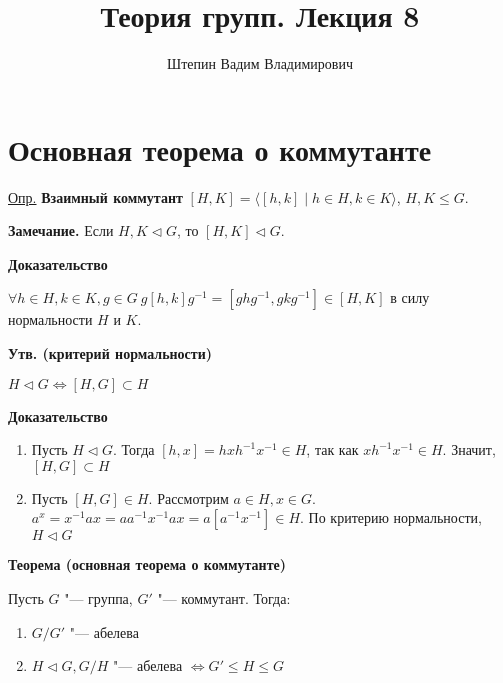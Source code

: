 \documentclass{article}
\title{Теория групп. Лекция 8}
\author{Штепин Вадим Владимирович}
\date{\DTMdate{2019-10-24}}
\begin{document}
\maketitle

\section{Основная теорема о коммутанте}

\underline{Опр.} \textbf{Взаимный коммутант} $[H, K] = \langle [h, k] \mid h \in H, k \in K \rangle$, $H,K \leq G$.

\vspace{5pt}

\textbf{Замечание.}
Если $H, K \triangleleft G$, то $[H, K] \triangleleft G$.

\textbf{Доказательство}

$\forall h \in H, k \in K, g \in G \  g[h, k]g^{-1} = [ghg^{-1}, gkg^{-1}] \in [H, K]$ в силу нормальности $H$ и $K$.

\vspace{10pt}

\textbf{Утв. (критерий нормальности)}

$H \triangleleft G \Leftrightarrow [H, G] \subset H$

\textbf{Доказательство}
\begin{enumerate}
	\item Пусть $H \triangleleft G$. Тогда $[h, x] = hxh^{-1}x^{-1} \in H$, так как $xh^{-1}x^{-1} \in H$. Значит, $[H, G] \subset H$
	\item Пусть $[H, G] \in H$. Рассмотрим $a \in H, x \in G$. $a^x = x^{-1}ax = aa^{-1}x^{-1}ax = a[a^{-1}x^{-1}] \in H$. По критерию нормальности, $H \triangleleft G$
\end{enumerate}

\vspace{10pt}

\textbf{Теорема (основная теорема о коммутанте)}

Пусть $G$ "--- группа, $G'$ "--- коммутант. Тогда:
\begin{enumerate}
	\item $G/G'$ "--- абелева
	\item $H \triangleleft G, G/H$ "--- абелева $\Leftrightarrow G' \leq H \leq G$ 
\end{enumerate}
\end{document}
